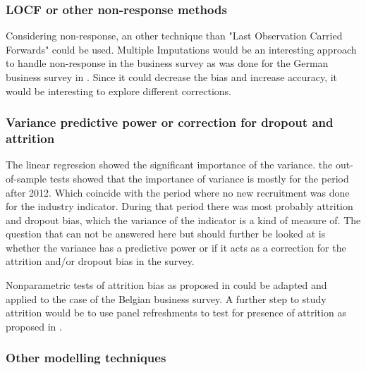 \documentclass[12pt,a4paper,oneside]{book}
\begin{document}
\subsubsection{LOCF or other non-response methods}
Considering non-response, an other technique than "Last Observation Carried Forwards" could be used. 
Multiple Imputations would be an interesting approach to handle non-response in the business survey as was done for the German business survey in \cite{seiler_microdata_2013}. 
Since it could decrease the bias and increase accuracy, it would be interesting to explore different corrections.


\subsubsection{Variance predictive power or correction for dropout and attrition}

The linear regression showed the significant importance of the variance. the out-of-sample tests showed that the importance of variance is mostly for the period after 2012. Which coincide with the period where no new recruitment was done for the industry indicator. During that period there was most probably attrition and dropout bias, which the variance of the indicator is a kind of measure of. The question that can not be answered here but should further be looked at is whether the variance has a predictive power or if it acts as a correction for the attrition and/or dropout bias in the survey.

Nonparametric tests of attrition bias as proposed in \cite{das_nonparametric_2011} could be adapted and applied to the case of the Belgian business survey.
A further step to study attrition would be to use panel refreshments to test for presence of attrition as proposed in \citep{van_landeghem_test_2014}.





\subsubsection{Other modelling techniques}
\end{document}
